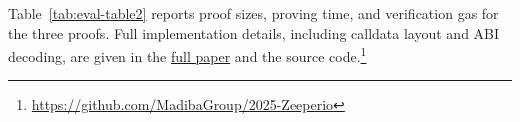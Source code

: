 

Table~\ref{tab:eval-table2} reports proof sizes, proving time, and verification gas for the three proofs. Full implementation details, including calldata layout and ABI decoding, are given in the \href{https://eprint.iacr.org/2026/565}{full paper} and the source code.\footnote{\url{https://github.com/MadibaGroup/2025-Zeeperio}}


% 



